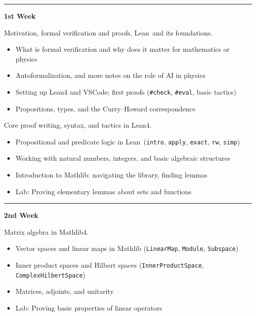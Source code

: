 \documentclass[11pt,a4paper]{article}
\newcommand{\lean}{{Lean}}
\newcommand{\mathlib}{{Mathlib}}
\begin{document}
\small
\begin{description}
    \hrule
    \item\begin{center} \textbf{1st Week} \end{center}
    \item[Lecture 1, 15 Sep:] Motivation, formal verification and proofs, \lean\ and its foundations.
    \begin{itemize}
        \item What is formal verification and why does it matter for mathematics or physics
        \item Autoformalization, and more notes on the role of AI in physics
        \item Setting up \lean4 and VSCode; first proofs (\verb|#check|, \verb|#eval|, basic tactics)
        \item Propositions, types, and the Curry--Howard correspondence
    \end{itemize}
    \item[Lecture 2, 17 Sep:] Core proof writing, syntax, and tactics in \lean4.
    \begin{itemize}
        \item Propositional and predicate logic in \lean\ (\verb|intro|, \verb|apply|, \verb|exact|, \verb|rw|, \verb|simp|)
        \item Working with natural numbers, integers, and basic algebraic structures
        \item Introduction to Mathlib: navigating the library, finding lemmas
        \item Lab: Proving elementary lemmas about sets and functions
    \end{itemize}
    \hrule
    \item\begin{center} \textbf{2nd Week} \end{center}
    \item[Lecture 3, 22 Sep:] Matrix algebra in \mathlib4.
    \begin{itemize}
        \item Vector spaces and linear maps in Mathlib (\verb|LinearMap|, \verb|Module|, \verb|Subspace|)
        \item Inner product spaces and Hilbert spaces (\verb|InnerProductSpace|, \verb|ComplexHilbertSpace|)
        \item Matrices, adjoints, and unitarity
        \item Lab: Proving basic properties of linear operators

\end{itemize}
\end{description}
\end{document}
